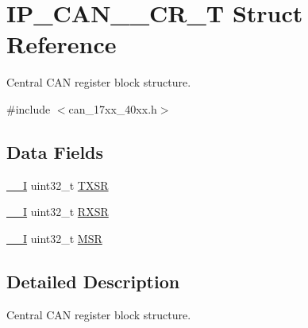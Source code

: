 \hypertarget{structIP__CAN__001__CR__T}{\section{I\-P\-\_\-\-C\-A\-N\-\_\-\_\-\-C\-R\-\_\-\-T Struct Reference}
\label{structIP__CAN__001__CR__T}
}


Central C\-A\-N register block structure.  




{\ttfamily \#include $<$can\-\_\-17xx\-\_\-40xx.\-h$>$}

\subsection*{Data Fields}
\begin{DoxyCompactItemize}
\item 
\hyperlink{core__cm3_8h_af63697ed9952cc71e1225efe205f6cd3}{\-\_\-\-\_\-\-I} uint32\-\_\-t \hyperlink{structIP__CAN__001__CR__T_a7ce56eda4c7eabebb9597b8b9cd418ac}{T\-X\-S\-R}
\item 
\hyperlink{core__cm3_8h_af63697ed9952cc71e1225efe205f6cd3}{\-\_\-\-\_\-\-I} uint32\-\_\-t \hyperlink{structIP__CAN__001__CR__T_a421bed687294a71ec89ece1ea01fc808}{R\-X\-S\-R}
\item 
\hyperlink{core__cm3_8h_af63697ed9952cc71e1225efe205f6cd3}{\-\_\-\-\_\-\-I} uint32\-\_\-t \hyperlink{structIP__CAN__001__CR__T_a4cfec80b7875ddddf16f1b7284280423}{M\-S\-R}
\end{DoxyCompactItemize}


\subsection{Detailed Description}
Central C\-A\-N register block structure. 

